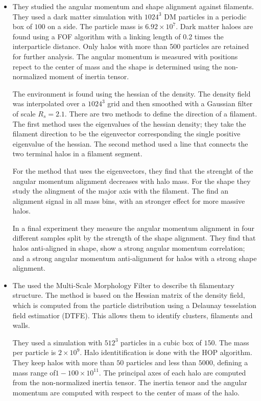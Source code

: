 \documentclass[useAMS,usenatbib]{mn2e}
\newcommand{\hMpc}{{\ifmmode{h^{-1}{\rm Mpc}}\else{$h^{-1}$Mpc }\fi}}
\newcommand{\hMsun}{{\ifmmode{h^{-1}{\rm
        {M_{\odot}}}}\else{$h^{-1}{\rm{M_{\odot}}}$~}\fi}}
\begin{document}
\begin{itemize}
\item
\citep{Zhang2009}

They studied the angular momentum and shape alignment against
filaments.  They used a dark matter simulation with $1024^3$ DM particles in a
periodic box of $100$ \hMpc on a side. The particle mass is
$6.92\times10^{7}$\hMsun. Dark matter haloes are found using a FOF
algorithm with a linking length of 0.2 times the interparticle
distance. Only halos with more than 500 particles are retained for
further analysis. The angular momentum is measured with positions
repect to the center of mass and the shape is determined using the
non-normalized moment of inertia tensor.

The environment is found using the hessian of the density. The density
field was interpolated over a $1024^3$ grid and then smoothed with a
Gaussian filter of scale $R_{s} = 2.1$\hMpc. There are two methods to
define the direction of a filament. The first method uses the
eigenvalues of the hessian density; they take the filament
direction to be the eigenvector corresponding the single positive
eigenvalue of the hessian. The second method used a line that
connects the two terminal halos in a filament segment.

For the method that uses the eigenvectors, they find that the strenght
of the angular momentum alignment decreases with halo mass. For the
shape they study the alingment of the major axis with the
filament. The find an alignment signal in all mass bins, with an
stronger effect for more massive halos.  

In a final experiment they measure the angular momentum alignment in four
different samples split by the strength of the shape alignment. They
find that halos anti-aligned in shape, show a strong angular momentum
correlation; and a strong angular momentum anti-alignment for halos
with a strong shape alignment. 

\item 
\citep{AragonCalvo2007} %


The used the Multi-Scale Morphology Filter to describe th filamentary
structure. The method is based on the Hessian matrix of the density
field, which is computed from the particle distribution using a
Delaunay tesselation field estimatior (DTFE). This allows them to
identify clusters, filaments and walls. 

They used a simulation with $512^3$ particles in a cubic box of $150$\hMpc. The
mass per particle is $2\times 10^{9}$\hMsun.  Halo identitification is
done with the HOP algorithm. They keep halos with more than $50$
particles and less than $5000$, defining a mass range of$1-100\times
10^{11}$\hMsun. The principal axes of each halo are computed from the
non-normalized inertia tensor. The inertia tensor and the angular
momentum are computed with respect to the center of mass of the halo.  


\end{itemize}
\end{document}
